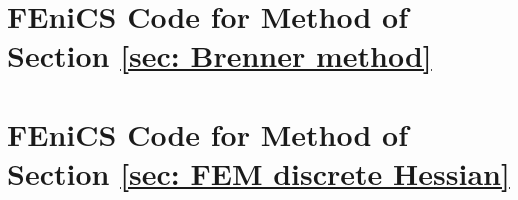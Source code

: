 \section{FEniCS Code for Method of Section \ref{sec: Brenner method}} \label{app: Code Brenner}

\section{FEniCS Code for Method of Section \ref{sec: FEM discrete Hessian}} \label{app: Code Neilan}

